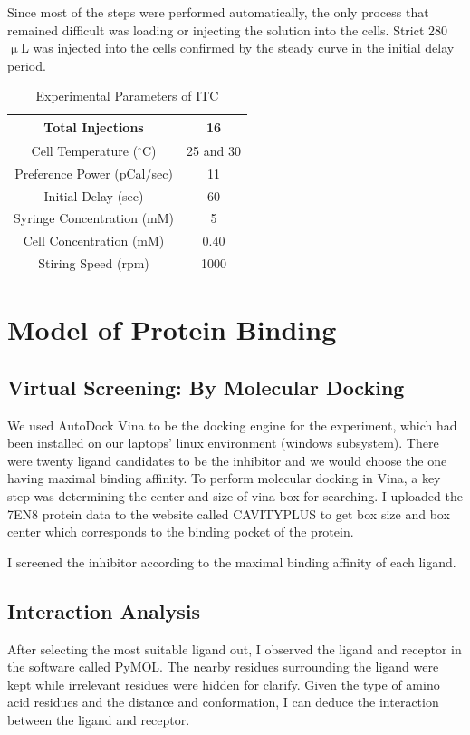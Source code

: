 \documentclass{report}
\begin{document}
Since most of the steps were performed automatically, the only process that remained difficult was loading or injecting the solution into the cells.
Strict 280 $\upmu$L was injected into the cells confirmed by the steady curve in the initial delay period.
\begin{table}
    \centering
    \caption{Experimental Parameters of ITC}
    \label{Experimental Parameters of ITC}
    \begin{tabular}{|c|c|}
        \toprule
        Total Injections & 16 \\
        \midrule
        Cell Temperature ($^\circ$C) & 25 and 30 \\
        Preference Power (pCal/sec) & 11 \\
        Initial Delay (sec) & 60 \\
        Syringe Concentration (mM) & 5 \\
        Cell Concentration (mM) & 0.40 \\
        Stiring Speed (rpm) & 1000 \\
        \bottomrule
    \end{tabular}
        
        
\end{table}
\section{Model of Protein Binding}
\subsection{Virtual Screening: By Molecular Docking}
We used AutoDock Vina to be the docking engine for the experiment, which had been installed on our laptops' linux environment (windows subsystem).
There were twenty ligand candidates to be the inhibitor and we would choose the one having maximal binding affinity.
To perform molecular docking in Vina, a key step was determining the center and size of vina box for searching.
I uploaded the 7EN8 protein data to the website called CAVITYPLUS to get box size and box center which corresponds to the binding pocket of the protein.

I screened the inhibitor according to the maximal binding affinity of each ligand.

\subsection{Interaction Analysis}
After selecting the most suitable ligand out, I observed the ligand and receptor in the software called PyMOL.
The nearby residues surrounding the ligand were kept while irrelevant residues were hidden for clarify.
Given the type of amino acid residues and the distance and conformation, I can deduce the interaction between the ligand and receptor.
\end{document}
